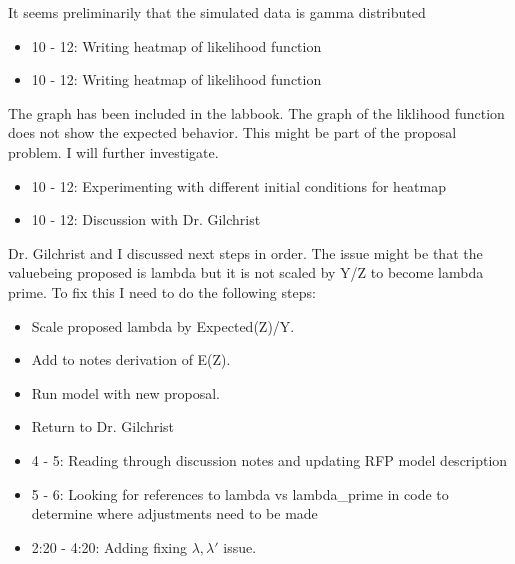 \documentclass[12pt,hyperref]{labbook}
\begin{document}
It seems preliminarily that the simulated data is gamma distributed
\begin{itemize}
    \item 10 - 12: Writing heatmap of likelihood function
\end{itemize}
\begin{itemize}
    \item 10 - 12: Writing heatmap of likelihood function
\end{itemize}
The graph has been included in the labbook. The graph of the liklihood function does not show the expected behavior.
This might be part of the proposal problem. I will further investigate.
\begin{itemize}
    \item 10 - 12: Experimenting with different initial conditions for heatmap
\end{itemize}
\begin{itemize}
    \item 10 - 12: Discussion with Dr. Gilchrist
\end{itemize}
Dr. Gilchrist and I discussed next steps in order. The issue might be that the valuebeing proposed is lambda but
it is not scaled by Y/Z to become lambda prime. To fix this I need to do the following steps:
\begin{itemize}
    \item Scale proposed lambda by Expected(Z)/Y.
    \item Add to notes derivation of E(Z).
    \item Run model with new proposal.
    \item Return to Dr. Gilchrist
\end{itemize}
\begin{itemize}
    \item 4 - 5: Reading through discussion notes and updating RFP model description
    \item 5 - 6: Looking for references to lambda vs lambda\_prime in code to determine where adjustments need to be made
\end{itemize}
\begin{itemize}
    \item 2:20 - 4:20: Adding fixing $\lambda, \lambda'$ issue.
\end{itemize}
\end{document}

